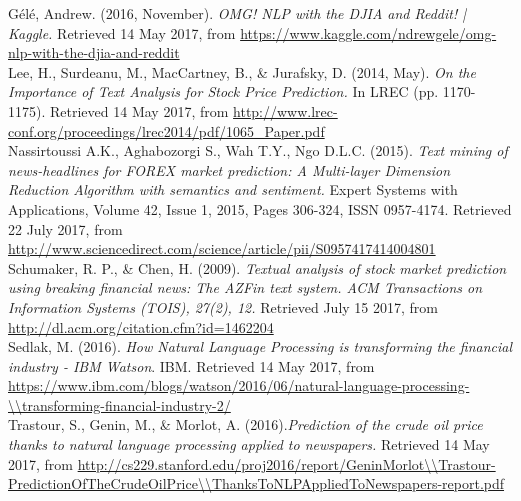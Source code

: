\documentclass[11pt,a4paper]{article}
\begin{document}
G\'el\'e, Andrew. (2016, November). \textit{OMG! NLP with the DJIA and Reddit! | Kaggle.} Retrieved 14 May 2017, from \url{https://www.kaggle.com/ndrewgele/omg-nlp-with-the-djia-and-reddit}\\

Lee, H., Surdeanu, M., MacCartney, B., \& Jurafsky, D. (2014, May). \textit{On the Importance of Text Analysis for Stock Price Prediction.} In LREC (pp. 1170-1175). Retrieved 14 May 2017, from \url{http://www.lrec-conf.org/proceedings/lrec2014/pdf/1065_Paper.pdf}\\

Nassirtoussi A.K., Aghabozorgi S., Wah T.Y., Ngo D.L.C. (2015). \textit{Text mining of news-headlines for FOREX market prediction: A Multi-layer Dimension Reduction Algorithm with semantics and sentiment.} Expert Systems with Applications, Volume 42, Issue 1, 2015, Pages 306-324, ISSN 0957-4174. Retrieved 22 July 2017, from \url{http://www.sciencedirect.com/science/article/pii/S0957417414004801}\\

Schumaker, R. P., \& Chen, H. (2009). \textit{Textual analysis of stock market prediction using breaking financial news: The AZFin text system. ACM Transactions on Information Systems (TOIS), 27(2), 12.} Retrieved July 15 2017, from \url{http://dl.acm.org/citation.cfm?id=1462204}\\


Sedlak, M. (2016). \textit{How Natural Language Processing is transforming the financial industry - IBM Watson}. IBM. Retrieved 14 May 2017, from \url{https://www.ibm.com/blogs/watson/2016/06/natural-language-processing-\\transforming-financial-industry-2/}\\

Trastour, S., Genin, M., \& Morlot, A. (2016).\textit{Prediction of the crude oil price thanks to natural language processing applied to newspapers.} Retrieved 14 May 2017, from \url{http://cs229.stanford.edu/proj2016/report/GeninMorlot\\Trastour-PredictionOfTheCrudeOilPrice\\ThanksToNLPAppliedToNewspapers-report.pdf}\\
\end{document}
